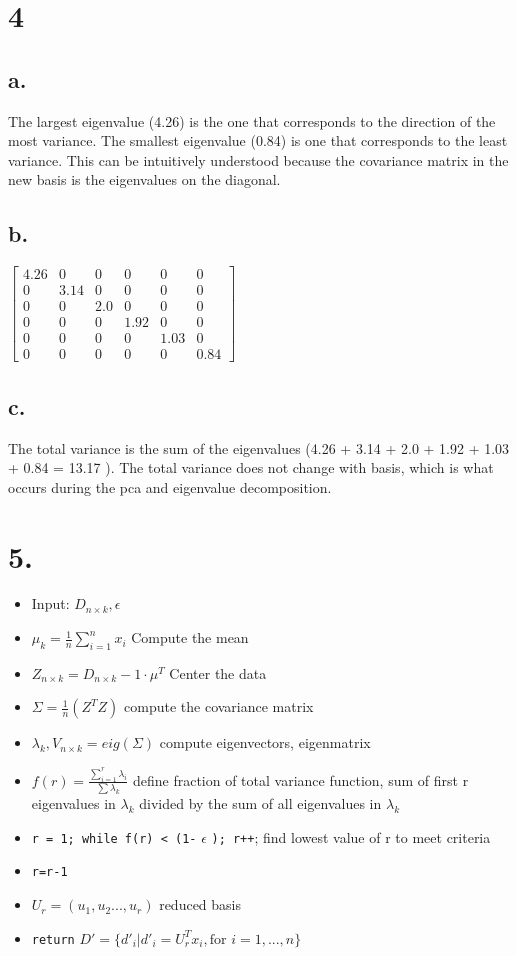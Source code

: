 \documentclass[11pt]{article}
\begin{document}
\section*{4}
\label{sec:org4649c20}
\subsection*{a.}
\label{sec:org435096b}
The largest eigenvalue (4.26) is the one that corresponds to the direction of the most
variance. The smallest eigenvalue (0.84) is one that corresponds to the least
variance. This can be intuitively understood because the covariance matrix in
the new basis is the eigenvalues on the diagonal.
\subsection*{b.}
\label{sec:org0189ec4}
\(\begin{bmatrix} 4.26 & 0 & 0 & 0 & 0 & 0 \\
0 & 3.14 & 0 & 0 & 0 & 0 \\
0 & 0 & 2.0 & 0 & 0 & 0 \\
0 & 0 & 0 & 1.92 & 0 & 0 \\
0 & 0 & 0 & 0 & 1.03 & 0 \\
0 & 0 & 0 & 0 & 0 & 0.84 \end{bmatrix}\)

\subsection*{c.}
\label{sec:orged2452a}
The total variance is the sum of the eigenvalues (4.26 + 3.14 + 2.0 + 1.92 +
1.03 + 0.84 = 13.17 ). The total variance does not
change with basis, which is what occurs during the pca and eigenvalue decomposition.

\section*{5.}
\label{sec:orgd6ba9f3}
\begin{itemize}
\item Input: \(D_{n \times k}, \epsilon\)
\item \(\mu_k = \frac{1}{n}\sum^n_{i=1} x_i\) Compute the mean
\item \(Z_{n\times k} = D_{n \times k} - 1 \cdot \mu^T\) Center the data
\item \(\Sigma = \frac{1}{n}(Z^TZ)\)  compute the covariance matrix
\item \(\lambda_k, V_{n \times k} = eig(\Sigma)\) compute eigenvectors, eigenmatrix
\item \(f(r) = \frac{\sum^r_{i=1}\lambda_i}{\sum\lambda_k}\) define fraction of total variance
function, sum of first r eigenvalues in \(\lambda_k\) divided by the sum of all
eigenvalues in \(\lambda_k\)
\item \texttt{r = 1; while f(r) < (1-} \(\epsilon\) \texttt{); r++}; find lowest value of r to meet criteria
\item \texttt{r=r-1}
\item \(U_r = (u_1, u_2 ... , u_r)\) reduced basis
\item \texttt{return} \(D' = \{d'_i | d'_i = U^T_rx_i, \text{for } i = 1, ..., n\}\)
\end{itemize}
\end{document}
